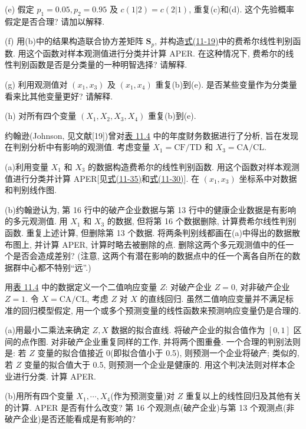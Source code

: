 
(e) 假定 $p_1=0.05,p_2=0.95$ 及 $c(1|2)=c(2|1)$, 重复(c)和(d). 这个先验概率假定是否合理? 请加以解释.

(f) 用(b)中的结果构造联合协方差矩阵 $\mathbf{S}_p$, 并构造\hyperref[eq:11-19]{式(11-19)}中的费希尔线性判别函数. 用这个函数对样本观测值进行分类并计算 APER. 在这种情况下, 费希尔的线性判别函数是否是分类量的一种明智选择? 请解释.

(g) 利用观测值对 $(x_1,x_3)$ 及 $(x_1,x_4)$ 重复(b)到(e). 是否某些变量作为分类量看来比其他变量更好? 请解释.

(h) 对所有四个变量 $(X_1,X_2,X_3,X_4)$ 重复(b)到(e).

\quad 约翰逊(Johnson, 见文献[19])曾对\hyperref[tab:11.4]{表 11.4} 中的年度财务数据进行了分析, 旨在发现在判别分析中有影响的观测值. 考虑变量 $X_1=\mathrm{CF}/\mathrm{TD}$ 和 $X_3=\mathrm{CA}/\mathrm{CL}$.

\noindent (a)\quad 利用变量 $X_1$ 和 $X_3$ 的数据构造费希尔的线性判别函数. 用这个函数对样本观测值进行分类并计算 APER[见\hyperref[eq:11-35]{式(11-35)}和\hyperref[eq:11-30]{式(11-30)}]. 在 $(x_1,x_3)$ 坐标系中对数据和判别线作图.

\noindent (b)\quad 约翰逊认为, 第 16 行中的破产企业数据与第 13 行中的健康企业数据是有影响的多元观测值. 用 $X_1$ 和 $X_3$ 的数据, 但将第 16 个数据删除, 计算费希尔线性判别函数. 重复上述计算, 但删除第 13 个数据. 将两条判别线都画在(a)中得出的数据散布图上, 并计算 APER, 计算时略去被删除的点. 删除这两个多元观测值中的任一个是否会造成差别? (注意, 这两个有潜在影响的数据点中的任一个离各自所在的数据群中心都不特别“远”.)

\quad 用\hyperref[tab:11.4]{表 11.4} 中的数据定义一个二值响应变量 $Z$: 对破产企业 $Z=0$, 对非破产企业 $Z=1$. 令 $X=\mathrm{CA}/\mathrm{CL}$, 考虑 $Z$ 对 $X$ 的直线回归. 虽然二值响应变量并不满足标准的回归模型假定, 用一个或多个预测变量的线性函数来预测响应变量仍是合理的.

\noindent (a)\quad 用最小二乘法来确定 $Z,X$ 数据的拟合直线. 将破产企业的拟合值作为 $[0,1]$ 区间的点作图. 对非破产企业重复同样的工作, 并将两个图重叠. 一个合理的判别法则是: 若 $Z$ 变量的拟合值接近 0(即拟合值小于 0.5), 则预测一个企业将破产; 类似的, 若 $Z$ 变量的拟合值大于 0.5, 则预测一个企业是健康的. 用这个判决法则对样本企业进行分类. 计算 APER.

\noindent (b)\quad 用所有四个变量 $X_1,\cdots,X_4$(作为预测变量)对 $Z$ 重复以上的线性回归及其他有关的计算. APER 是否有什么改变? 第 16 个观测点(破产企业)与第 13 个观测点(非破产企业)是否还能看成是有影响的?

